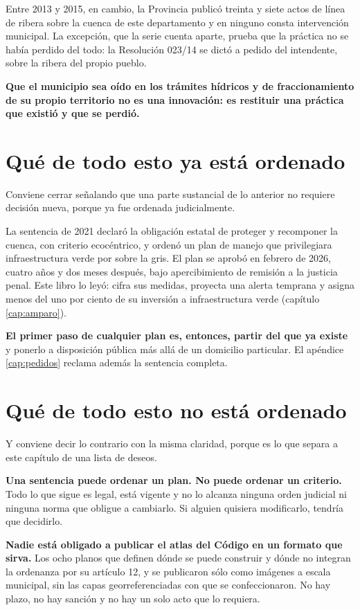 Entre 2013 y 2015, en cambio, la Provincia publicó treinta y siete actos de línea de ribera sobre la
cuenca de este departamento y en ninguno consta intervención municipal. La excepción, que la serie cuenta aparte, prueba que la práctica no se había perdido del todo: la Resolución 023/14 se dictó a pedido del intendente, sobre la ribera del propio pueblo.

\textbf{Que el municipio sea oído en los trámites hídricos y de fraccionamiento de su propio
territorio no es una innovación: es restituir una práctica que existió y que se perdió.}

\section{Qué de todo esto ya está ordenado}

Conviene cerrar señalando que una parte sustancial de lo anterior no requiere decisión nueva,
porque ya fue ordenada judicialmente.

La sentencia de 2021 declaró la obligación estatal de proteger y recomponer la cuenca, con
criterio ecocéntrico, y ordenó un plan de manejo que privilegiara infraestructura verde por
sobre la gris. El plan se aprobó en febrero de 2026, cuatro años y dos meses después, bajo apercibimiento de remisión a la justicia penal. Este libro lo leyó: cifra sus medidas, proyecta una alerta temprana y asigna menos del uno por ciento de su inversión a infraestructura verde (capítulo \ref{cap:amparo}).

\textbf{El primer paso de cualquier plan es, entonces, partir del que ya existe} y ponerlo a disposición pública más allá de un domicilio particular. El apéndice \ref{cap:pedidos} reclama además la sentencia completa.

\section{Qué de todo esto no está ordenado}

Y conviene decir lo contrario con la misma claridad, porque es lo que separa a este capítulo
de una lista de deseos.

\textbf{Una sentencia puede ordenar un plan. No puede ordenar un criterio.} Todo lo que sigue
es legal, está vigente y no lo alcanza ninguna orden judicial ni ninguna norma que obligue a
cambiarlo. Si alguien quisiera modificarlo, tendría que decidirlo.

\textbf{Nadie está obligado a publicar el atlas del Código en un formato que sirva.} Los ocho planos que definen dónde se puede construir y dónde no integran la ordenanza por su artículo 12, y se publicaron sólo como imágenes a escala municipal, sin las capas georreferenciadas con que se confeccionaron. No
hay plazo, no hay sanción y no hay un solo acto que lo requiera.

